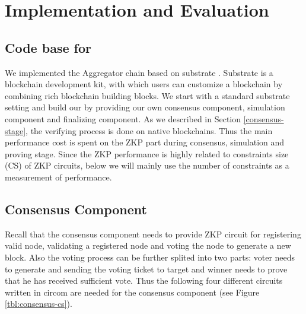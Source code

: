 \section{Implementation and Evaluation}
\label{chp:bench}
\subsection{Code base for \dprotocol}
We implemented the Aggregator chain based on substrate \cite{substrate}. Substrate is a blockchain development kit, with which users can customize a blockchain by combining rich blockchain building blocks. We start with a standard substrate setting and build our \dprotocol by providing our own consensus component, simulation component and finalizing component. As we described in Section \ref{consensus-stage}, the verifying process is done on native blockchains. Thus the main performance cost is spent on the ZKP part during consensus, simulation and proving stage. Since the ZKP performance is highly related to constraints size (CS) of ZKP circuits, below we will mainly use the number of constraints as a measurement of performance. 

\subsection {Consensus Component}
Recall that the consensus component needs to provide ZKP circuit for registering valid node, validating a registered node and voting the node to generate a new block. Also the voting process can be further splited into two parts: voter needs to generate and sending the voting ticket to target and winner needs to prove that he has received sufficient vote.  Thus the following four different circuits written in circom \cite{munoz2022circom} are needed for the consensus component (see Figure \ref{tbl:consensus-cs}).

